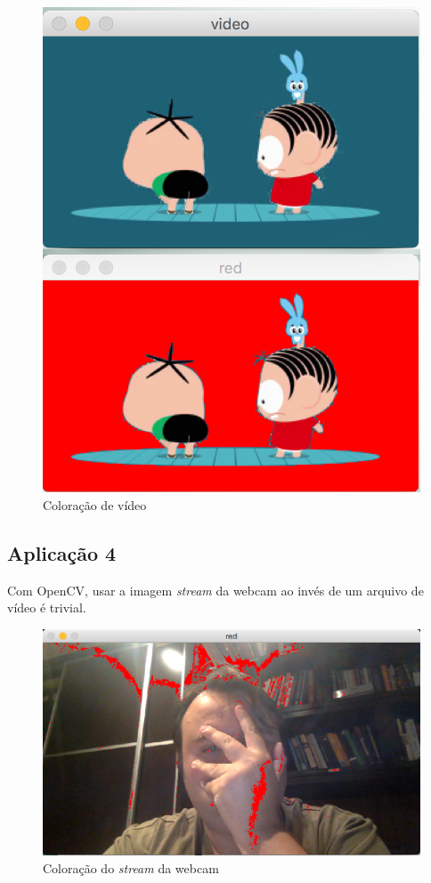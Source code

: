 \documentclass[conference]{IEEEtran}
\begin{document}
\begin{figure}[h!]
\begin{center}
\includegraphics[width=0.66\columnwidth]{toy.png}
\caption{Coloração de vídeo}
\end{center}
\end{figure}


\subsection*{Aplicação 4}
Com OpenCV, usar a imagem \textit{stream} da webcam ao invés de um arquivo de vídeo é trivial.
\begin{figure}[h!]
\begin{center}
\includegraphics[width=0.66\columnwidth]{cam.png}
\caption{Coloração do \textit{stream} da webcam}
\end{center}
\end{figure}
\end{document}
